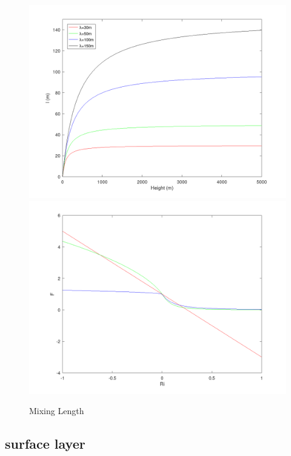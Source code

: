 \begin{figure}[htbp]\vspace*{0cm}\hspace*{0cm}
\includegraphics[angle=0,scale=0.2]{Figures/Apx_VarDiff/Kz_MixLen.png}\includegraphics[angle=0,scale=0.2]{Figures/Apx_VarDiff/Kz_Fc.png}\\
\parbox{15cm}{\caption{\label{FigVarDiff_Kz_MixLen}
Mixing Length
}}
\end{figure}


\subsection{surface layer}

